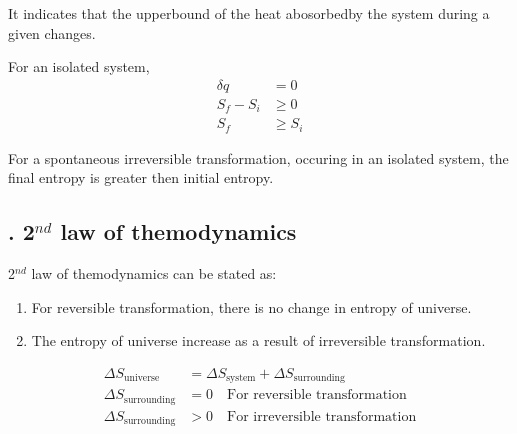 \documentclass[fleqn,10pt]{SelfArx} %
\begin{document}
It indicates that the upperbound of the heat abosorbedby the system during a given changes.

For an isolated system,
\begin{align}
    \delta q &= 0 \\
    S_f - S_i &\geq 0 \\ 
    S_f &\geq S_i 
\end{align}

For a spontaneous irreversible transformation, occuring in an isolated system, the final entropy is greater then initial entropy. 

\subsection{. 2$^{nd}$ law of themodynamics}
2$^{nd}$ law of themodynamics can be stated as:
\begin{enumerate}
    \item For reversible transformation, there is no change in entropy of universe.
    \item The entropy of universe increase as a result of irreversible transformation.
\end{enumerate}

\begin{align*}
    \Delta S_{\text{universe}} &= \Delta S_{\text{system}} +\Delta S_{\text{surrounding}} \\
    \Delta S_{\text{surrounding}} &= 0 \quad \text{For reversible transformation} \\
    \Delta S_{\text{surrounding}} &> 0 \quad \text{For irreversible transformation}
\end{align*}
\end{document}
